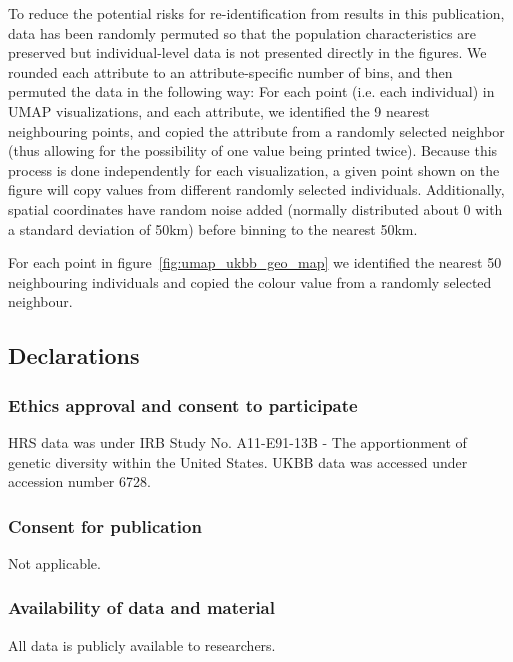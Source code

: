 \documentclass[12pt]{pnas-new}
\begin{document}
{To reduce the potential risks for re-identification from results in this publication, data has been randomly permuted so that the population characteristics are preserved but individual-level data is not presented directly in the figures. We rounded each attribute to an attribute-specific number of bins, and then permuted the data in the following way: 
For each point (i.e. each individual) in UMAP visualizations, and each attribute, we identified the 9 nearest neighbouring points, and copied the attribute from a randomly selected neighbor (thus allowing for the possibility of one value being printed twice).  Because this process is done independently for each visualization, a given point shown on the figure will copy values from different randomly selected individuals. Additionally, spatial coordinates have random noise added (normally distributed about 0 with a standard deviation of 50km) before binning to the nearest 50km.

For each point in figure~\ref{fig:umap_ukbb_geo_map} we identified the nearest 50 neighbouring individuals and copied the colour value from a randomly selected neighbour.}

\showmatmethods{} %



\subsection*{Declarations}
\subsubsection*{Ethics approval and consent to participate}
HRS data was under IRB Study No. A11-E91-13B - The apportionment of genetic diversity within the United States. UKBB data was accessed under accession number 6728.

\subsubsection*{Consent for publication} Not applicable.

\subsubsection*{Availability of data and material} All data is publicly available to researchers.
\end{document}
